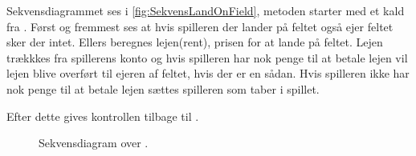 Sekvensdiagrammet ses i \vref{fig:SekvensLandOnField}, metoden starter med et kald fra . Først og fremmest ses at hvis spilleren der lander på feltet også ejer feltet sker der intet. Ellers beregnes lejen(rent), prisen for at lande på feltet. Lejen trækkkes fra spillerens konto og hvis spilleren har nok penge til at betale lejen vil lejen blive overført til ejeren af feltet, hvis der er en sådan. Hvis spilleren ikke har nok penge til at betale lejen sættes spilleren som taber i spillet.

Efter dette gives kontrollen tilbage til .


\begin{figure}
\caption{Sekvensdiagram over .}
\label{fig:SekvensLandOnField}
\centering

\end{figure}